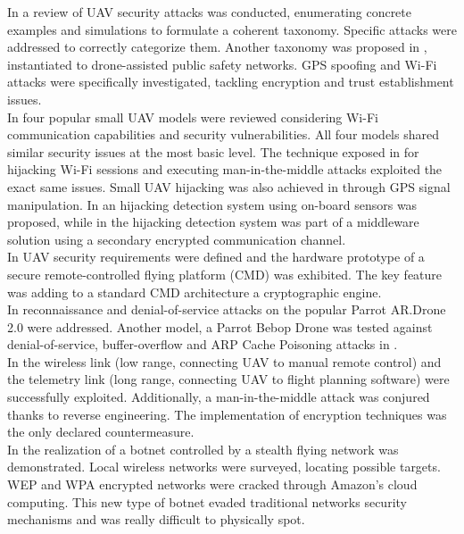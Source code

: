 \documentclass[journal]{IEEEtran}
\begin{document}
In \cite{uavvulnerabilitiesreview} a review of UAV security attacks was conducted, enumerating concrete examples and simulations to formulate a coherent taxonomy. Specific attacks were addressed to correctly categorize them. Another taxonomy was proposed in \cite{publicsafetynetworksecurity}, instantiated to drone-assisted public safety networks. GPS spoofing and Wi-Fi attacks were specifically investigated, tackling encryption and trust establishment issues.
\\
In \cite{smartcitiesdronesecurity} four popular small UAV models were reviewed considering Wi-Fi communication capabilities and security vulnerabilities. All four models shared similar security issues at the most basic level. The technique exposed in \cite{accessvulnerabilities} for hijacking Wi-Fi sessions and executing man-in-the-middle attacks exploited the exact same issues. Small UAV hijacking was also achieved in \cite{anatomyspoofing} through GPS signal manipulation. In \cite{gpshijackingdetection} an hijacking detection system using on-board sensors was proposed, while in \cite{encryptedchannel} the hijacking detection system was part of a middleware solution using a secondary encrypted communication channel.
\\
In \cite{powercryptoprocessors} UAV security requirements were defined and the hardware prototype of a secure remote-controlled flying platform (CMD) was exhibited. The key feature was adding to a standard CMD architecture a cryptographic engine.
\\
In \cite{dosardrone} reconnaissance and denial-of-service attacks on the popular Parrot AR.Drone 2.0 \cite{ardrone} were addressed. Another model, a Parrot Bebop Drone \cite{bebop} was tested against denial-of-service, buffer-overflow and ARP Cache Poisoning attacks in \cite{uavcommonsecurityattacks}.
\\
In \cite{exploringuavvulnerabilities} the wireless link (low range, connecting UAV to manual remote control) and the telemetry link (long range, connecting UAV to flight planning software) were successfully exploited. Additionally, a man-in-the-middle attack was conjured thanks to reverse engineering. The implementation of encryption techniques was the only declared countermeasure.
\\
In \cite{skynet} the realization of a botnet controlled by a stealth flying network was demonstrated. Local wireless networks were surveyed, locating possible targets. WEP and WPA encrypted networks were cracked through Amazon's cloud computing. This new type of botnet evaded traditional networks security mechanisms and was really difficult to physically spot.
\end{document}
